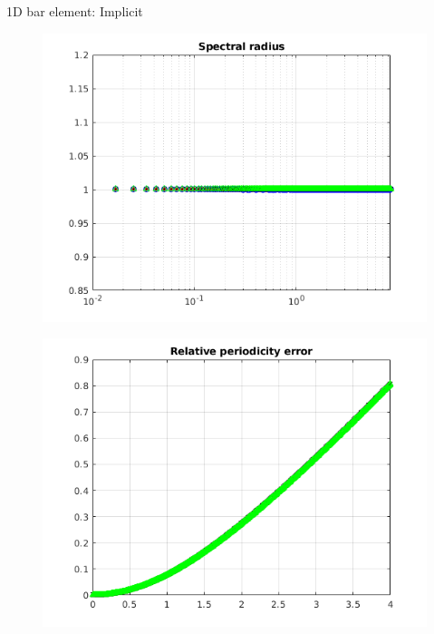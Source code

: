 \begin{frame}{1D bar element: Implicit}
\begin{figure}[ht]
\begin{minipage}[b]{0.5\linewidth}
  \end{minipage}%
  \begin{minipage}[b]{0.5\linewidth}
    \centering
    \includegraphics[scale=.35]{images/bar-imp-2.png} \\
  \end{minipage} 
  \begin{minipage}[b]{0.5\linewidth}
    \centering
    \includegraphics[scale=.35]{images/bar-imp-3.png} \\


\end{minipage}
\end{figure}
\end{frame}

